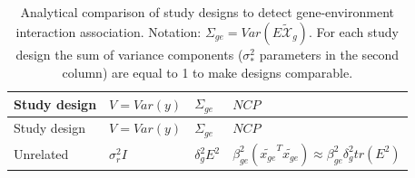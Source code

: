 \documentclass[]{book}
\begin{document}
\begin{longtable}[]{@{}llll@{}}
\caption{\label{tab:assoc-ge} Analytical comparison of study designs to
detect gene-environment interaction association. Notation:
\(\Sigma_{ge} = Var(E \mathcal{\tilde{X}}_g)\). For each study design
the sum of variance components (\(\sigma^2_{*}\) parameters in the
second column) are equal to 1 to make designs
comparable.}\tabularnewline
\toprule
\begin{minipage}[b]{0.18\columnwidth}\raggedright\strut
Study design\strut
\end{minipage} & \begin{minipage}[b]{0.09\columnwidth}\raggedright\strut
\(V = Var(y)\)\strut
\end{minipage} & \begin{minipage}[b]{0.07\columnwidth}\raggedright\strut
\(\Sigma_{ge}\)\strut
\end{minipage} & \begin{minipage}[b]{0.42\columnwidth}\raggedright\strut
\(NCP\)\strut
\end{minipage}\tabularnewline
\midrule
\endfirsthead
\toprule
\begin{minipage}[b]{0.18\columnwidth}\raggedright\strut
Study design\strut
\end{minipage} & \begin{minipage}[b]{0.09\columnwidth}\raggedright\strut
\(V = Var(y)\)\strut
\end{minipage} & \begin{minipage}[b]{0.07\columnwidth}\raggedright\strut
\(\Sigma_{ge}\)\strut
\end{minipage} & \begin{minipage}[b]{0.42\columnwidth}\raggedright\strut
\(NCP\)\strut
\end{minipage}\tabularnewline
\midrule
\endhead
\begin{minipage}[t]{0.18\columnwidth}\raggedright\strut
Unrelated\strut
\end{minipage} & \begin{minipage}[t]{0.09\columnwidth}\raggedright\strut
\(\sigma_r^2 I\)\strut
\end{minipage} & \begin{minipage}[t]{0.07\columnwidth}\raggedright\strut
\(\delta_g^2 E^2\)\strut
\end{minipage} & \begin{minipage}[t]{0.42\columnwidth}\raggedright\strut
\(\beta^2_{ge} (\tilde{x_{ge}}^T \tilde{x_{ge}}) \approx \beta^2_{ge} \delta_g^2 tr(E^2)\)\strut
\end{minipage}\tabularnewline

\end{longtable}
\end{document}
